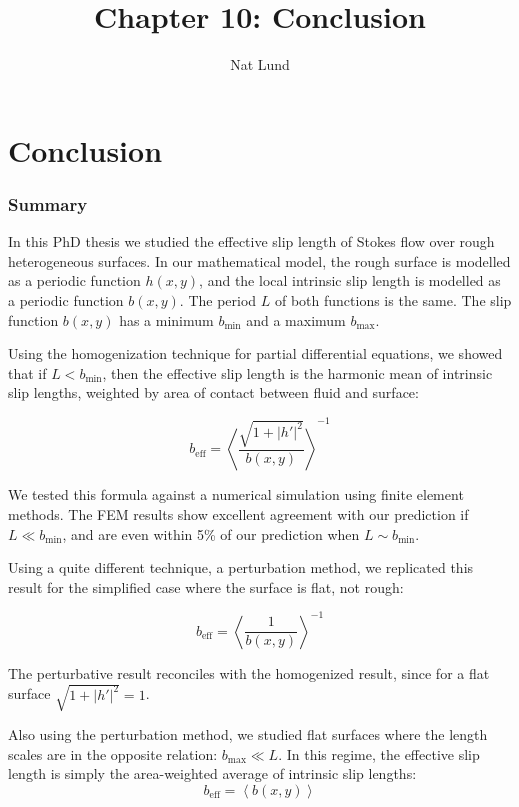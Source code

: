 \documentclass[12pt, a4paper, twoside, openright]{book}
\title{Chapter 10: Conclusion}
\author{Nat Lund}
\newcommand{\beff}{\ensuremath{b_{\mathrm{eff}}}}
\newcommand{\bmin}{\ensuremath{b_{\mathrm{min}}}}
\newcommand{\bmax}{\ensuremath{b_{\mathrm{max}}}}
\begin{document}
\chapter{Conclusion}

\subsection*{Summary}

In this PhD thesis we studied the effective slip length of Stokes flow over rough heterogeneous surfaces.  In our mathematical model, the rough surface is modelled as a periodic function $h(x,y)$, and the local intrinsic slip length is modelled as a periodic function $b(x,y)$.  The period $L$ of both functions is the same.  The slip function $b(x,y)$ has a minimum $\bmin$ and a maximum $\bmax$.

Using the homogenization technique for partial differential equations, we showed that if $L < \bmin$, then the effective slip length is the harmonic mean of intrinsic slip lengths, weighted by area of contact between fluid and surface:

\begin{equation}
\beff = \left< \frac{\sqrt{1+ |h'|^2}}{b(x,y)} \right>^{-1}
\end{equation}

We tested this formula against a numerical simulation using finite element methods.  The FEM results show excellent agreement with our prediction if $L \ll \bmin$, and are even within 5\% of our prediction when $L \sim \bmin$.

\vspace*{1em}
Using a quite different technique, a perturbation method, we replicated this result for the simplified case where the surface is flat, not rough:

\begin{equation}
\beff = \left< \frac{1}{b(x,y)} \right>^{-1}
\end{equation}

The perturbative result reconciles with the homogenized result, since for a flat surface $\sqrt{1+ |h'|^2} = 1$.

Also using the perturbation method, we studied flat surfaces where the length scales are in the opposite relation: $\bmax \ll L$.  In this regime, the effective slip length is simply the area-weighted average of intrinsic slip lengths:
\begin{equation}
\beff = \left< b(x,y) \right>
\end{equation}
\end{document}
